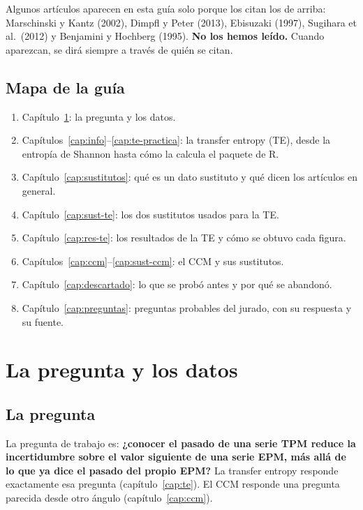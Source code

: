 \documentclass[11pt,openany]{book}
\begin{document}
\begin{ojo}
Algunos artículos aparecen en esta guía solo porque los citan los de arriba: Marschinski y Kantz (2002), Dimpfl y Peter (2013), Ebisuzaki (1997), Sugihara et al.\ (2012) y Benjamini y Hochberg (1995). \textbf{No los hemos leído.} Cuando aparezcan, se dirá siempre a través de quién se citan.
\end{ojo}

\section*{Mapa de la guía}

\begin{enumerate}
\item Capítulo~\ref{cap:datos}: la pregunta y los datos.
\item Capítulos~\ref{cap:info}--\ref{cap:te-practica}: la transfer entropy (TE), desde la entropía de Shannon hasta cómo la calcula el paquete de R.
\item Capítulo~\ref{cap:sustitutos}: qué es un dato sustituto y qué dicen los artículos en general.
\item Capítulo~\ref{cap:sust-te}: los dos sustitutos usados para la TE.
\item Capítulo~\ref{cap:res-te}: los resultados de la TE y cómo se obtuvo cada figura.
\item Capítulos~\ref{cap:ccm}--\ref{cap:sust-ccm}: el CCM y sus sustitutos.
\item Capítulo~\ref{cap:descartado}: lo que se probó antes y por qué se abandonó.
\item Capítulo~\ref{cap:preguntas}: preguntas probables del jurado, con su respuesta y su fuente.
\end{enumerate}

\chapter{La pregunta y los datos}\label{cap:datos}

\section{La pregunta}

La pregunta de trabajo es: \textbf{¿conocer el pasado de una serie TPM reduce la incertidumbre sobre el valor siguiente de una serie EPM, más allá de lo que ya dice el pasado del propio EPM?} La transfer entropy responde exactamente esa pregunta (capítulo~\ref{cap:te}). El CCM responde una pregunta parecida desde otro ángulo (capítulo~\ref{cap:ccm}).
\end{document}

